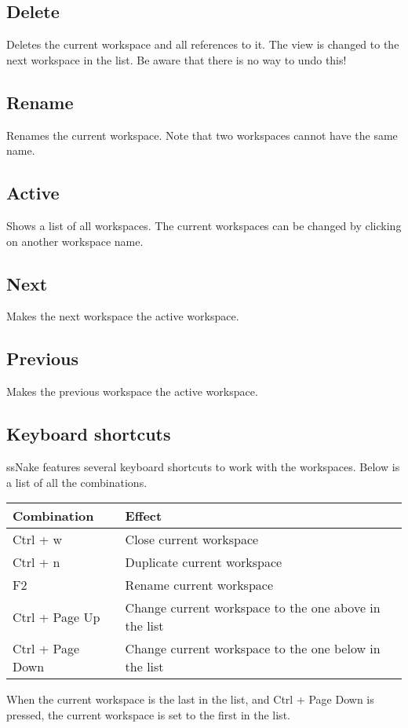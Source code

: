 \documentclass[11pt,a4paper]{article}
\begin{document}
\subsection{Delete}
Deletes the current workspace and all references to it. The view is changed to the next workspace in the list. Be aware that there is no way to undo this!

\subsection{Rename}
Renames the current workspace. Note that two workspaces cannot have the same name.

\subsection{Active}
Shows a list of all workspaces. The current workspaces can be changed by clicking on another workspace name.

\subsection{Next}
Makes the next workspace the active workspace.

\subsection{Previous}
Makes the previous workspace the active workspace.


\subsection{Keyboard shortcuts}
ssNake features several keyboard shortcuts to work with the workspaces. Below is a list of all the combinations.
\begin{center}
\begin{tabular}{ll}
\toprule
Combination & Effect \\
\midrule
\rowcolor{gray!30!white}
Ctrl + w & Close current workspace\\
Ctrl + n & Duplicate current workspace\\
\rowcolor{gray!30!white}
F2 & Rename  current workspace\\
Ctrl + Page Up & Change current workspace to the one above in the list\\
\rowcolor{gray!30!white}
Ctrl + Page Down & Change current workspace to the one below in the list\\
\bottomrule
\end{tabular}
\end{center}
When the current workspace is the last in the list, and Ctrl + Page Down is pressed, the current workspace is set to the first in the list.
\end{document}
